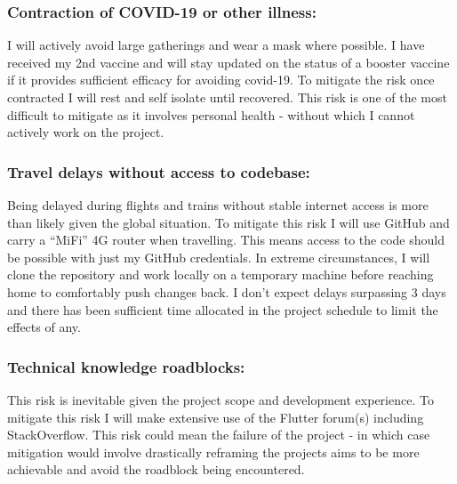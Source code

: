 \subsubsection{Contraction of COVID-19 or other illness:}
\label{risk:mitigation-covid}
\vspace{-2mm}
I will actively avoid large gatherings and wear a mask where possible. I have received my 2nd vaccine and will
stay updated on the status of a booster vaccine if it provides sufficient efficacy
for avoiding covid-19. To mitigate the risk once contracted I will rest
and self isolate until recovered. This risk is one of the most difficult to mitigate as 
it involves personal health - without which I cannot actively work on the project.

\subsubsection{Travel delays without access to codebase:}
\label{risk:mitigation-travel}
\vspace{-2mm}
Being delayed during flights and trains without stable internet access is more than likely given
the global situation. To mitigate this risk I will use GitHub and carry a ``MiFi'' 4G router when travelling.
This means access to the code should be possible with just my GitHub credentials. In extreme circumstances,
I will clone the repository and work locally on a temporary machine before reaching home to comfortably push changes back.
I don't expect delays surpassing 3 days and there has been sufficient time allocated in the project schedule to 
limit the effects of any.

\subsubsection{Technical knowledge roadblocks:}
\label{risk:mitigation-roadblocks}
\vspace{-2mm}
This risk is inevitable given the project scope and development experience.
To mitigate this risk I will make extensive use of the Flutter forum(s) including
StackOverflow. This risk could mean the failure of the project - in which case
mitigation would involve drastically reframing the projects aims to be more achievable and avoid
the roadblock being encountered.

